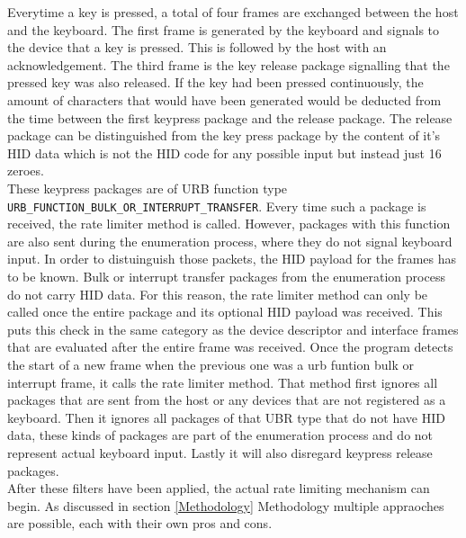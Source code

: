 Everytime a key is pressed, a total of four frames are exchanged between the host and the keyboard. The first frame is generated by the keyboard and signals to the device that a key is pressed. This is followed by the host with an acknowledgement. The third frame is the key release package signalling that the pressed key was also released. If the key had been pressed continuously, the amount of characters that would have been generated would be deducted from the time between the first keypress package and the release package. The release package can be distinguished from the key press package by the content of it's HID data which is not the HID code for any possible input but instead just 16 zeroes. \\
These keypress packages are of URB function type \verb|URB_FUNCTION_BULK_OR_INTERRUPT_TRANSFER|. Every time such a package is received, the rate limiter method is called. However, packages with this function are also sent during the enumeration process, where they do not signal keyboard input. In order to distuinguish those packets, the HID payload for the frames has to be known. Bulk or interrupt transfer packages from the enumeration process do not carry HID data. For this reason, the rate limiter method can only be called once the entire package and its optional HID payload was received. This puts this check in the same category as the device descriptor and interface frames that are evaluated after the entire frame was received. Once the program detects the start of a new frame when the previous one was a urb funtion bulk or interrupt frame, it calls the rate limiter method. That method first ignores all packages that are sent from the host or any devices that are not registered as a keyboard. Then it ignores all packages of that UBR type that do not have HID data, these kinds of packages are part of the enumeration process and do not represent actual keyboard input. Lastly it will also disregard keypress release packages. \\

After these filters have been applied, the actual rate limiting mechanism can begin. As discussed in section \ref{Methodology} Methodology multiple appraoches are possible, each with their own pros and cons. \\



